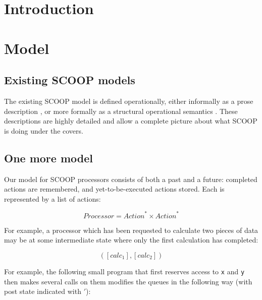 \documentclass[a4]{article}
\begin{document}
\section{Introduction}


\section{Model}

\subsection{Existing SCOOP models}
The existing SCOOP model is defined operationally,
either informally as a prose description \cite{nienaltowski:2007:SCOOP},
or more formally as a 
structural operational semantics \cite{morandi-et-al:2013:prototyping}.
These descriptions are highly detailed and allow a complete
picture about what SCOOP is doing under the covers.

\subsection{One more model}

Our model for SCOOP processors consists of both a past and a future:
completed actions are remembered,
and yet-to-be-executed actions stored.
Each is represented by a list of actions:

\def\proc{\mathit{Processor}}
\def\act{\mathit{Action}}

\[
\proc = \act^{*} \times \act^{*}
\]

For example, a processor which has been requested to calculate
two pieces of data may be at some intermediate state where
only the first calculation has completed:

\[
\left(\left[\mathit{calc_1}\right],\left[\mathit{calc_2}\right] \right)
\]

For example, the following small program that first reserves access to
\texttt{x} and \texttt{y} then makes several calls on them modifies
the queues in the following way (with post state indicated with $\mathit{'}$):
\end{document}
